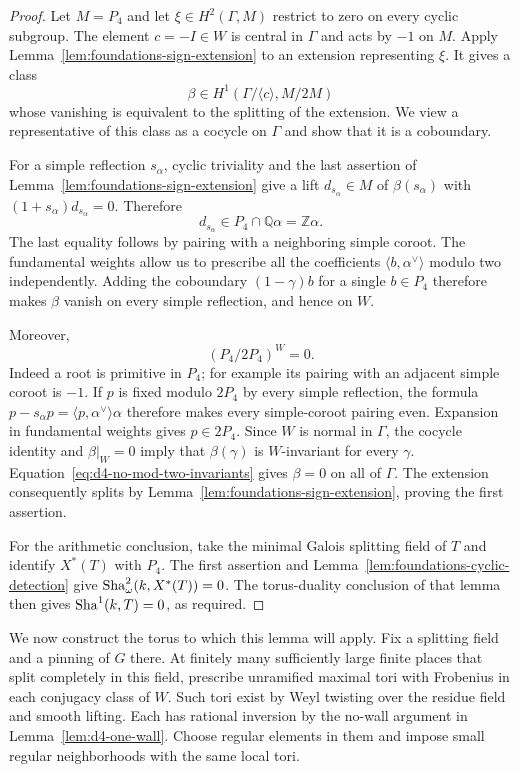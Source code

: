 \begin{proof}
Let $M=P_4$ and let $\xi\in H^2(\Gamma,M)$ restrict to zero on every
cyclic subgroup.  The element $c=-I\in W$ is central in $\Gamma$ and
acts by $-1$ on $M$.  Apply Lemma~\ref{lem:foundations-sign-extension}
to an extension representing $\xi$.  It gives a class
\[
 \beta\in H^1(\Gamma/\langle c\rangle,M/2M)
\]
whose vanishing is equivalent to the splitting of the extension.  We
view a representative of this class as a cocycle on $\Gamma$ and show
that it is a coboundary.

For a simple reflection $s_\alpha$, cyclic triviality and the last
assertion of Lemma~\ref{lem:foundations-sign-extension} give a lift
$d_{s_\alpha}\in M$ of $\beta(s_\alpha)$ with
$(1+s_\alpha)d_{s_\alpha}=0$.  Therefore
\[
 d_{s_\alpha}\in P_4\cap\mathbb Q\alpha=\mathbb Z\alpha.
\]
The last equality follows by pairing with a neighboring simple coroot.
The fundamental weights allow us to prescribe all the coefficients
$\langle b,\alpha^\vee\rangle$ modulo two independently.  Adding the
coboundary $(1-\gamma)b$ for a single $b\in P_4$ therefore makes
$\beta$ vanish on every simple reflection, and hence on $W$.

Moreover,
\begin{equation}\label{eq:d4-no-mod-two-invariants}
 (P_4/2P_4)^W=0.
\end{equation}
Indeed a root is primitive in $P_4$; for example its pairing with an
adjacent simple coroot is $-1$.  If $p$ is fixed modulo $2P_4$ by every
simple reflection, the formula
$p-s_\alpha p=\langle p,\alpha^\vee\rangle\alpha$ therefore makes
every simple-coroot pairing even.  Expansion in fundamental weights
gives $p\in2P_4$.  Since $W$ is normal in $\Gamma$, the cocycle identity
and $\beta|_W=0$ imply that $\beta(\gamma)$ is $W$-invariant for every
$\gamma$.  Equation~\eqref{eq:d4-no-mod-two-invariants} gives
$\beta=0$ on all of $\Gamma$.  The extension consequently splits by
Lemma~\ref{lem:foundations-sign-extension}, proving the first assertion.

For the arithmetic conclusion, take the minimal Galois splitting field
of $T$ and identify $X^*(T)$ with $P_4$.  The first assertion and
Lemma~\ref{lem:foundations-cyclic-detection} give
$\operatorname{Sha}^2_\omega(k,X^*(T))=0$.  The torus-duality conclusion of that
lemma then gives $\operatorname{Sha}^1(k,T)=0$, as required.
\end{proof}

We now construct the torus to which this lemma will apply.  Fix a
splitting field and a pinning of $G$ there.  At finitely many sufficiently
large finite places that split completely in this field, prescribe
unramified maximal tori with Frobenius in each conjugacy class of $W$.
Such tori exist by Weyl twisting over the residue field and smooth
lifting.  Each has rational inversion by the no-wall argument in
Lemma~\ref{lem:d4-one-wall}.  Choose regular elements in them and impose
small regular neighborhoods with the same local tori.

